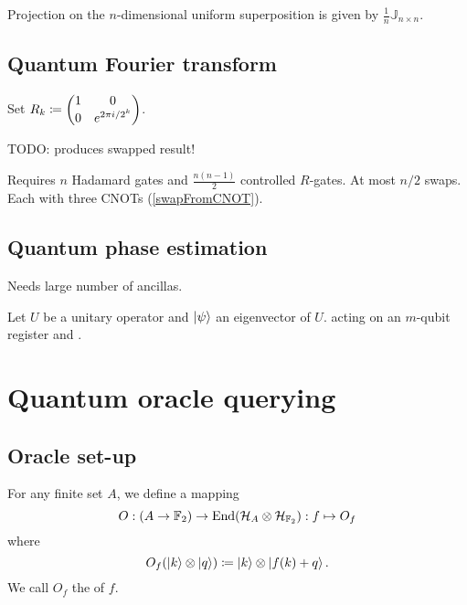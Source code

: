 Projection on the $n$-dimensional uniform superposition is given by $\frac{1}{n}\mathbb{J}_{n\times n}$.
\subsection{Quantum Fourier transform}
Set $R_k \coloneqq \begin{pmatrix}
1 & 0 \\ 0 & e^{2\pi i / 2^k}
\end{pmatrix}$.

TODO: produces swapped result!

Requires $n$ Hadamard gates and $\frac{n(n-1)}{2}$ controlled $R$-gates. At most $n/2$ swaps. Each with three CNOTs (\ref{swapFromCNOT}).

\subsection{Quantum phase estimation}
Needs large number of ancillas.

\begin{proposition}
Let $U$ be a unitary operator and $\left| \psi \right\rangle$ an eigenvector of $U$. acting on an $m$-qubit register and . 
\end{proposition}



\section{Quantum oracle querying}
\subsection{Oracle set-up}
\begin{definition}
For any finite set $A$, we define a mapping
\[ O: (A\to \mathbb{F}_2) \to \operatorname{End}(\mathcal{H}_{A}\otimes \mathcal{H}_{\mathbb{F}_2}): f\mapsto O_f \]
where
\[ O_f(\left| k \right\rangle\otimes \left| q \right\rangle) \coloneqq \left| k \right\rangle\otimes \left| f(k) + q \right\rangle.  \]
We call $O_f$ the  of $f$.
\end{definition}


